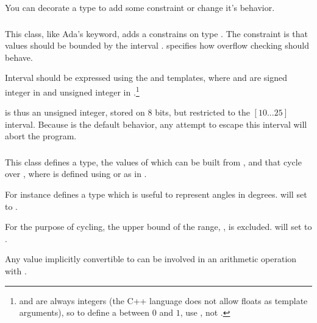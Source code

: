 You can decorate a type to add some constraint or change it's
behavior.

\subsubsection{}

This class, like Ada's  keyword, adds a constrains on type
.  The constraint is that values should be bounded by
the interval .   specifies how overflow
checking should behave.

Interval should be expressed using the  and
 templates, where  and  are
signed integer in  and unsigned integer in
.\footnote{%
   and  are always integers (the C++ language does
not allow floats as template arguments), so to define a 
between $0$ and $1$, use , not
. }%


 is thus an unsigned integer,
stored on 8 bits, but restricted to the $[10...25]$ interval.  Because
 is the default behavior, any attempt to escape this
interval will abort the program.


\subsubsection{}

This class defines a type, the values of which can be built from
, and that cycle over , where  is
defined using  or 
as in .

For instance 
defines a type which is useful to represent angles in degrees.
 will set  to .

For the purpose of cycling, the upper bound of the range, ,
is excluded.   will set  to .

Any value implicitly convertible to  can be involved in an
arithmetic operation with .

